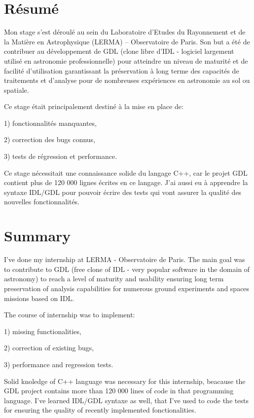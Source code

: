 \section*{Résumé}

Mon stage s’est déroulé au sein du Laboratoire d'Etudes du Rayonnement et de la Matière en Astrophysique (LERMA) – Observatoire de Paris. Son but a été de contribuer au développement de GDL (clone libre d'IDL - logiciel largement utilisé en astronomie professionnelle) pour atteindre un niveau de maturité et de facilité d'utilisation garantissant la préservation à long terme des capacités de traitements et d'analyse pour de nombreuses expériences en astronomie au sol ou spatiale.

Ce stage était principalement destiné à la mise en place de:

1) fonctionnalités manquantes,

2) correction des bugs connus,

3) tests de régression et performance.


Ce stage nécessitait une connaissance solide du langage C++, car le projet GDL contient plus de 120 000 lignes écrites en ce langage. J'ai aussi eu à apprendre la syntaxe IDL/GDL pour pouvoir écrire des tests qui vont assurer la qualité des nouvelles fonctionnalités.


\section*{Summary}

I've done my internship at LERMA - Observatoire de Paris. The main goal was to contribute to GDL (free clone of IDL - very popular software in the domain of astronomy) to reach a level of maturity and usability ensuring long term preservation of analysis capabilities for numerous ground experiments and spaces missions based on IDL.

The course of internship was to implement:

1) missing functionalities,

2) correction of existing bugs,

3) performance and regression tests.

Solid knoledge of C++ language was necessary for this internship, beacause the GDL project contains more than 120 000 lines of code in that programming language. I've learned IDL/GDL syntaxe as well, that I've used to code the tests for ensuring the quality of recently implemented fonctionalities.
